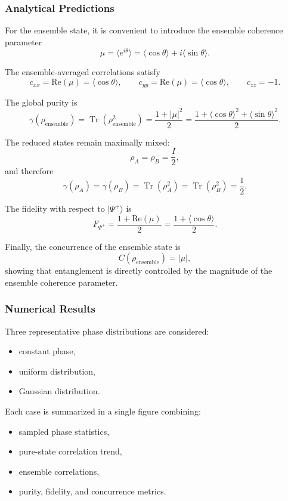 \documentclass[a4paper]{article}
\begin{document}
\subsubsection{Analytical Predictions}

For the ensemble state, it is convenient to introduce the ensemble coherence parameter
\[
\mu = \langle e^{i\theta} \rangle
=
\langle \cos\theta \rangle + i \langle \sin\theta \rangle.
\]

The ensemble-averaged correlations satisfy
\[
c_{xx} = \mathrm{Re}(\mu) = \langle \cos\theta \rangle,\qquad
c_{yy} = \mathrm{Re}(\mu) = \langle \cos\theta \rangle,\qquad
c_{zz} = -1.
\]

The global purity is
\[
\gamma(\rho_{\mathrm{ensemble}})
=
\operatorname{Tr}(\rho_{\mathrm{ensemble}}^2)
=
\frac{1 + |\mu|^2}{2}
=
\frac{1 + \langle \cos\theta \rangle^2 + \langle \sin\theta \rangle^2}{2}.
\]

The reduced states remain maximally mixed:
\[
\rho_A = \rho_B = \frac{I}{2},
\]
and therefore
\[
\gamma(\rho_A)=\gamma(\rho_B)
=
\operatorname{Tr}(\rho_A^2)=\operatorname{Tr}(\rho_B^2)=\frac{1}{2}.
\]

The fidelity with respect to \( |\Psi^+\rangle \) is
\[
F_{\Psi^+}
=
\frac{1 + \mathrm{Re}(\mu)}{2}
=
\frac{1 + \langle \cos\theta \rangle}{2}.
\]

Finally, the concurrence of the ensemble state is
\[
C(\rho_{\mathrm{ensemble}}) = |\mu|,
\]
showing that entanglement is directly controlled by the magnitude of the ensemble coherence parameter.

\subsubsection{Numerical Results}

Three representative phase distributions are considered:
\begin{itemize}
    \item constant phase,
    \item uniform distribution,
    \item Gaussian distribution.
\end{itemize}

Each case is summarized in a single figure combining:
\begin{itemize}
    \item sampled phase statistics,
    \item pure-state correlation trend,
    \item ensemble correlations,
    \item purity, fidelity, and concurrence metrics.
\end{itemize}
\end{document}
